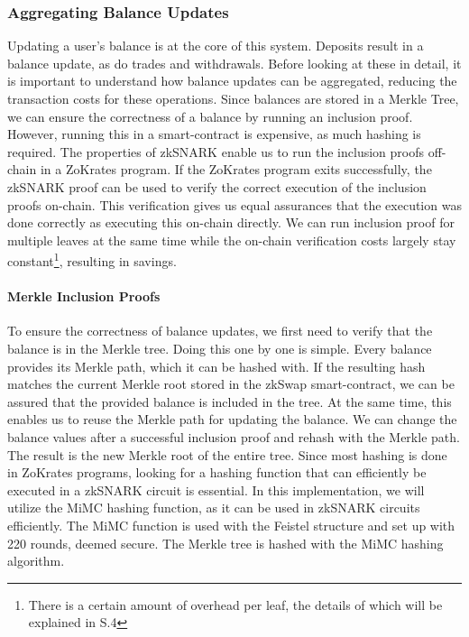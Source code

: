 \documentclass[../../thesis.tex]{subfiles}
\begin{document}
\subsubsection{Aggregating Balance Updates} \label{aggr_balance}
Updating a user's balance is at the core of this system. Deposits result in a balance update, as do trades and withdrawals. Before looking at these in detail, it is important to understand how balance updates can be aggregated, reducing the transaction costs for these operations. Since balances are stored in a Merkle Tree, we can ensure the correctness of a balance by running an inclusion proof. However, running this in a smart-contract is expensive, as much hashing is required. The properties of zkSNARK enable us to run the inclusion proofs off-chain in a ZoKrates program. If the ZoKrates program exits successfully, the zkSNARK proof can be used to verify the correct execution of the inclusion proofs on-chain. This verification gives us equal assurances that the execution was done correctly as executing this on-chain directly. We can run inclusion proof for multiple leaves at the same time while the on-chain verification costs largely stay constant\footnote{There is a certain amount of overhead per leaf, the details of which will be explained in S.4}, resulting in savings.

\paragraph{Merkle Inclusion Proofs}
To ensure the correctness of balance updates, we first need to verify that the balance is in the Merkle tree. Doing this one by one is simple. Every balance provides its Merkle path, which it can be hashed with. If the resulting hash matches the current Merkle root stored in the zkSwap smart-contract, we can be assured that the provided balance is included in the tree. At the same time, this enables us to reuse the Merkle path for updating the balance. We can change the balance values after a successful inclusion proof and rehash with the Merkle path. The result is the new Merkle root of the entire tree. Since most hashing is done in ZoKrates programs, looking for a hashing function that can efficiently be executed in a zkSNARK circuit is essential. In this implementation, we will utilize the MiMC \cite{albrecht2016mimc} hashing function, as it can be used in zkSNARK circuits efficiently. The MiMC function is used with the Feistel structure and set up with 220 rounds, deemed secure. The Merkle tree is hashed with the MiMC hashing algorithm. 
\end{document}
